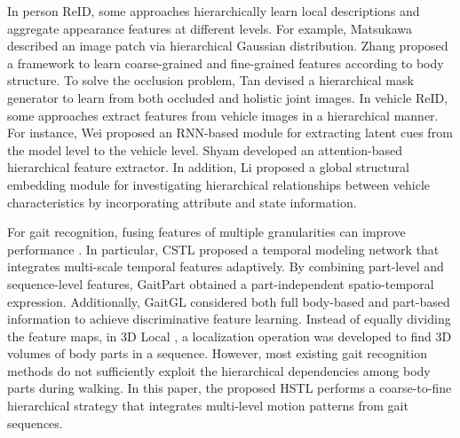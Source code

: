 \documentclass[10pt,twocolumn,letterpaper]{article}
\begin{document}
In person ReID, some approaches  \cite{matsukawa2016hierarchical,zhang2022person,wang2021robust,tan2022dynamic,zhang2021coarse} hierarchically learn local descriptions and aggregate appearance features at different levels. For example, Matsukawa \etal \cite{matsukawa2016hierarchical} described an image patch via hierarchical Gaussian distribution. Zhang \etal \cite{zhang2021coarse} proposed a framework to learn coarse-grained and fine-grained features according to body structure. To solve the occlusion problem, Tan \etal \cite{tan2022dynamic} devised a hierarchical mask generator to learn from both occluded and holistic joint images. In vehicle ReID, some approaches \cite{wei2018coarse,shyam2021adversarially,li2022attribute}
extract features from vehicle images in a hierarchical manner. For instance, Wei \etal \cite{wei2018coarse} proposed an RNN-based module for extracting latent cues from the model level to the vehicle level. Shyam \etal \cite{shyam2021adversarially} developed an attention-based hierarchical feature extractor. In addition, Li \etal \cite{li2022attribute} proposed a global structural embedding module for investigating hierarchical relationships between vehicle characteristics by incorporating attribute and state information.

For gait recognition, fusing features of multiple granularities can improve performance \cite{zhang2019cross,fan2020gaitpart,lin2021gait,lin2021gaitmask,huang20213d,chai2022lagrange}. In particular, CSTL \cite{huang2021context} proposed a temporal modeling network that integrates multi-scale temporal features adaptively. By combining part-level and sequence-level features, GaitPart \cite{fan2020gaitpart} obtained a part-independent spatio-temporal expression. Additionally, GaitGL \cite{lin2021gait} considered both full body-based and part-based information to achieve discriminative feature learning. Instead of equally dividing the feature maps, in 3D Local \cite{huang20213d},  a localization operation was developed to find 3D volumes of body parts in a sequence. However, most existing gait recognition methods do not sufficiently exploit the hierarchical dependencies among body parts during walking. In this paper, the proposed HSTL performs a coarse-to-fine hierarchical strategy that integrates multi-level motion patterns from gait sequences.
\end{document}
